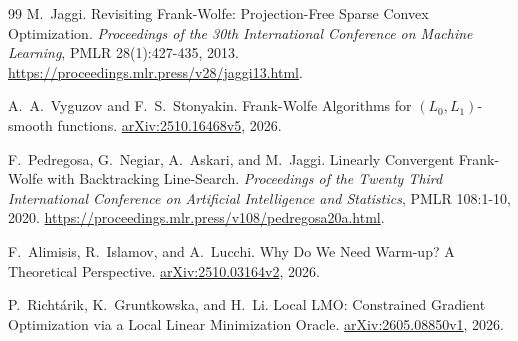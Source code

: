 \begin{thebibliography}{99}
M.~Jaggi.
Revisiting Frank-Wolfe: Projection-Free Sparse Convex Optimization.
\emph{Proceedings of the 30th International Conference on Machine Learning},
PMLR 28(1):427-435, 2013.
\url{https://proceedings.mlr.press/v28/jaggi13.html}.

A.~A.~Vyguzov and F.~S.~Stonyakin.
Frank-Wolfe Algorithms for $(L_0,L_1)$-smooth functions.
\href{https://arxiv.org/abs/2510.16468v5}{arXiv:2510.16468v5}, 2026.

F.~Pedregosa, G.~Negiar, A.~Askari, and M.~Jaggi.
Linearly Convergent Frank-Wolfe with Backtracking Line-Search.
\emph{Proceedings of the Twenty Third International Conference on
Artificial Intelligence and Statistics}, PMLR 108:1-10, 2020.
\url{https://proceedings.mlr.press/v108/pedregosa20a.html}.

F.~Alimisis, R.~Islamov, and A.~Lucchi.
Why Do We Need Warm-up? A Theoretical Perspective.
\href{https://arxiv.org/abs/2510.03164v2}{arXiv:2510.03164v2}, 2026.

P.~Richt\'{a}rik, K.~Gruntkowska, and H.~Li.
Local LMO: Constrained Gradient Optimization via a Local Linear
Minimization Oracle.
\href{https://arxiv.org/abs/2605.08850v1}{arXiv:2605.08850v1}, 2026.
\end{thebibliography}
